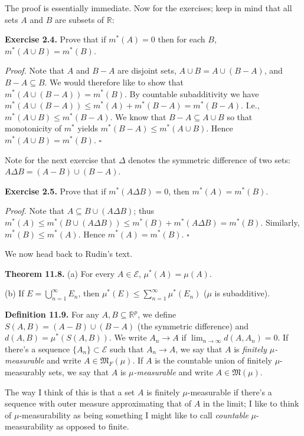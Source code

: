\documentclass[a4paper]{article}
\newcommand{\R}{\mathbb{R}}
\begin{document}
The proof is essentially immediate. Now for the exercises; keep in mind that all sets $A$ and $B$ are subsets of $\R$:

\textbf{Exercise 2.4.} Prove that if $m^*(A) = 0$ then for each $B$, $m^*(A \cup B) = m^*(B)$.

\emph{Proof.} Note that $A$ and $B - A$ are disjoint sets, $A \cup B = A \cup (B - A)$, and $B - A \subseteq B$. We would therefore like to show that $m^*(A \cup (B - A)) = m^*(B)$. By countable subadditivity we have $m^*(A \cup (B - A)) \leq m^*(A) + m^*(B - A) = m^*(B - A)$. I.e., $m^*(A \cup B) \leq m^*(B - A)$. We know that $B - A \subseteq A \cup B$ so that monotonicity of $m^*$ yields $m^*(B - A) \leq m^*(A \cup B)$. Hence $m^*(A \cup B) = m^*(B)$. $\square$

Note for the next exercise that $\Delta$ denotes the symmetric difference of two sets: $A \Delta B = (A - B) \cup (B - A)$.

\textbf{Exercise 2.5.} Prove that if $m^*(A \Delta B) = 0$, then $m^*(A) = m^*(B)$.

\emph{Proof.} Note that $A \subseteq B \cup (A \Delta B)$; thus $m^*(A) \leq m^*(B \cup (A \Delta B)) \leq m^*(B) + m^*(A \Delta B) = m^*(B)$. Similarly, $m^*(B) \leq m^*(A)$. Hence $m^*(A) = m^*(B)$. $\square$

We now head back to Rudin's text.

\textbf{Theorem 11.8.} (a) For every $A \in \mathscr{E}$, $\mu^*(A) = \mu(A)$.

(b) If $E = \bigcup_{n=1}^\infty E_n$, then $\mu^*(E) \leq \sum_{n=1}^\infty \mu^*(E_n)$ ($\mu$ is subadditive).

\textbf{Definition 11.9.} For any $A, B \subseteq \R^p$, we define $S(A, B) = (A - B) \cup (B - A)$ (the symmetric difference) and $d(A, B) = \mu^*(S(A, B))$. We write $A_n \to A$ if $\lim_{n \to \infty} d(A, A_n) = 0$. If there's a sequence $\{A_n\} \subset \mathscr{E}$ such that $A_n \to A$, we say that $A$ is \emph{finitely $\mu$-measurable} and write $A \in \mathfrak{M}_F(\mu)$. If $A$ is the countable union of finitely $\mu$-measurably sets, we say that $A$ is \emph{$\mu$-measurable} and write $A \in \mathfrak{M}(\mu)$.

The way I think of this is that a set $A$ is finitely $\mu$-measurable if there's a sequence with outer measure approximating that of $A$ in the limit; I like to think of $\mu$-measurability as being something I might like to call \emph{countable} $\mu$-measurability as opposed to finite.
\end{document}
